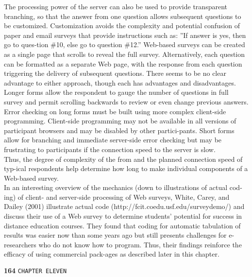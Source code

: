 \documentclass{article}
\begin{document}
\hspace*{0.5cm} The processing power of the server can also be used to provide transparent branching, so that the answer from one question allows subsequent questions to be customized. Customization avoids the complexity and potential confusion of paper and email surveys that provide instructions such as: ''If answer is yes, then go to ques-tion \#10, else go to question \#12.'' Web-based surveys can be created as a single page that scrolls to reveal the full survey. Alternatively, each question can be formatted as a separate Web page, with the response from each question triggering the delivery of subsequent questions. There seems to be no clear advantage to either approach, though each has advantages and disadvantages. Longer forms allow the respondent to gauge the number of questions in full survey and permit scrolling backwards to review or even change previous answers. Error checking on long forms must be built using more complex client-side programming. Client-side programming may not be available in all versions of participant browsers and may be disabled by other partici-pants. Short forms allow for branching and immediate server-side error checking but may be frustrating to participants if the connection speed to the server is slow.\\ 

Thus, the degree of complexity of the from and the planned connection speed of typ-ical respondents help determine how long to make individual components of a Web-based survey.\\
\hspace*{0.5cm} In an interesting overview of the mechanics (down to illustrations of actual cod-ing) of client- and server-side processing of Web surveys, White, Carey, and Dailey (2001) illustrate actual code (http://fcit.coedu.usf.edu/surveydemo/) and discuss their use of a Web survey to determine students' potential for success in distance education courses. They found that coding for automatic tabulation of results was easier now than some years ago but still presents challenges for e-researchers who do not know how to program. Thus, their findings reinforce the efficacy of using commercial pack-ages as described later in this chapter.\\

\newpage

\begin{flushleft}
\textbf{164}\hspace*{1cm} \texttt{CHAPTER ELEVEN}
\end{flushleft}
\end{document}
